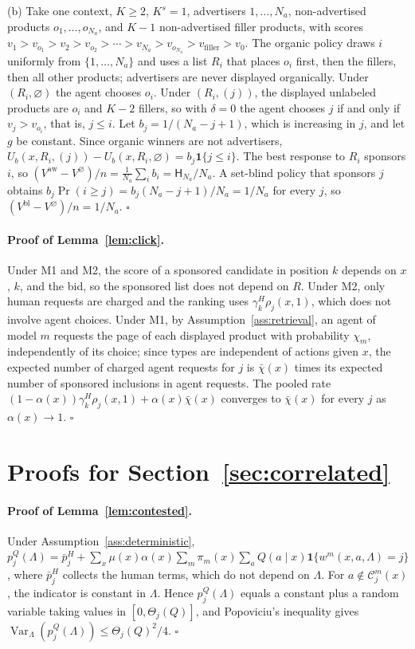 \documentclass[opre,dblanonrev]{informs4}
\providecommand{\1}{\mathbf{1}}
\providecommand{\Var}{\operatorname{Var}}
\begin{document}
\begin{APPENDICES}
(b) Take one context, $K\ge2$, $K^s=1$, advertisers $1,\ldots,N_a$, non-advertised products $o_1,\ldots,o_{N_a}$, and $K-1$ non-advertised filler products, with scores
$v_1>v_{o_1}>v_2>v_{o_2}>\cdots>v_{N_a}>v_{o_{N_a}}>v_{\mathrm{filler}}>v_0$. The organic policy draws $i$ uniformly from $\{1,\ldots,N_a\}$ and uses a list $R_i$ that places $o_i$ first, then the fillers, then all other products; advertisers are never displayed organically. Under $(R_i,\varnothing)$ the agent chooses $o_i$. Under $(R_i,(j))$, the displayed unlabeled products are $o_i$ and $K-2$ fillers, so with $\delta=0$ the agent chooses $j$ if and only if $v_j>v_{o_i}$, that is, $j\le i$. Let $b_j=1/(N_a-j+1)$, which is increasing in $j$, and let $g$ be constant. Since organic winners are not advertisers, $U_b(x,R_i,(j))-U_b(x,R_i,\varnothing)=b_j\1\{j\le i\}$. The best response to $R_i$ sponsors $i$, so $(V^{\mathrm{aw}}-V^{\varnothing})/n=\frac1{N_a}\sum_ib_i=\mathsf H_{N_a}/N_a$. A set-blind policy that sponsors $j$ obtains $b_j\Pr(i\ge j)=b_j(N_a-j+1)/N_a=1/N_a$ for every $j$, so $(V^{\mathrm{bl}}-V^{\varnothing})/n=1/N_a$. \hfill$\square$

\paragraph{Proof of Lemma~\ref{lem:click}.}
Under M1 and M2, the score of a sponsored candidate in position $k$ depends on $x$, $k$, and the bid, so the sponsored list does not depend on $R$. Under M2, only human requests are charged and the ranking uses $\gamma_k^H\rho_j(x,1)$, which does not involve agent choices. Under M1, by Assumption~\ref{ass:retrieval}, an agent of model $m$ requests the page of each displayed product with probability $\chi_m$, independently of its choice; since types are independent of actions given $x$, the expected number of charged agent requests for $j$ is $\bar\chi(x)$ times its expected number of sponsored inclusions in agent requests. The pooled rate $(1-\alpha(x))\gamma_k^H\rho_j(x,1)+\alpha(x)\bar\chi(x)$ converges to $\bar\chi(x)$ for every $j$ as $\alpha(x)\to1$. \hfill$\square$

\section{Proofs for Section~\ref{sec:correlated}}\label{app:correlated}

\paragraph{Proof of Lemma~\ref{lem:contested}.}
Under Assumption~\ref{ass:deterministic}, $p_j^Q(\Lambda)=\bar p_j^H+\sum_x\mu(x)\alpha(x)\sum_m\pi_m(x)\sum_aQ(a\mid x)\1\{w^m(x,a,\Lambda)=j\}$, where $\bar p_j^H$ collects the human terms, which do not depend on $\Lambda$. For $a\notin\mathcal C_j^m(x)$, the indicator is constant in $\Lambda$. Hence $p_j^Q(\Lambda)$ equals a constant plus a random variable taking values in $[0,\Theta_j(Q)]$, and Popoviciu's inequality gives $\Var_\Lambda(p_j^Q(\Lambda))\le\Theta_j(Q)^2/4$. \hfill$\square$


\end{APPENDICES}
\end{document}
